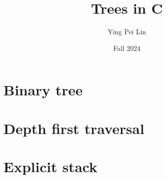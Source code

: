 \documentclass[a4paper,11pt]{article}
\begin{document}
\title{
  \textbf{Trees in C}
}
\author{Ying Pei Lin}
\date{Fall 2024}

\maketitle

\section*{Binary tree}

\section*{Depth first traversal}

\section*{Explicit stack}
\end{document}
